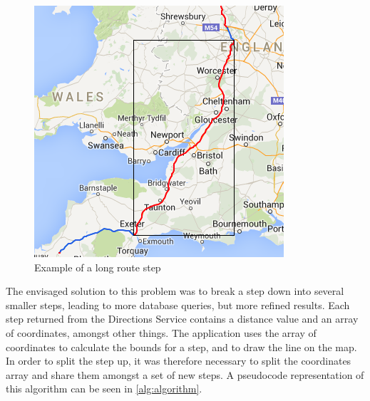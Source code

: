 \documentclass[authoryearcitations]{UoYCSproject}
\begin{document}
\begin{figure}
	\center
	\includegraphics[scale=0.7]{longroutestep}
	\caption{Example of a long route step}
	\label{fig:longroutestep}
\end{figure}

The envisaged solution to this problem was to break a step down into several smaller steps, leading to more database queries, but more refined results. Each step returned from the Directions Service contains a distance value and an array of coordinates, amongst other things. The application uses the array of coordinates to calculate the bounds for a step, and to draw the line on the map. In order to split the step up, it was therefore necessary to split the coordinates array and share them amongst a set of new steps. A pseudocode representation of this algorithm can be seen in \autoref{alg:algorithm}.
\end{document}
